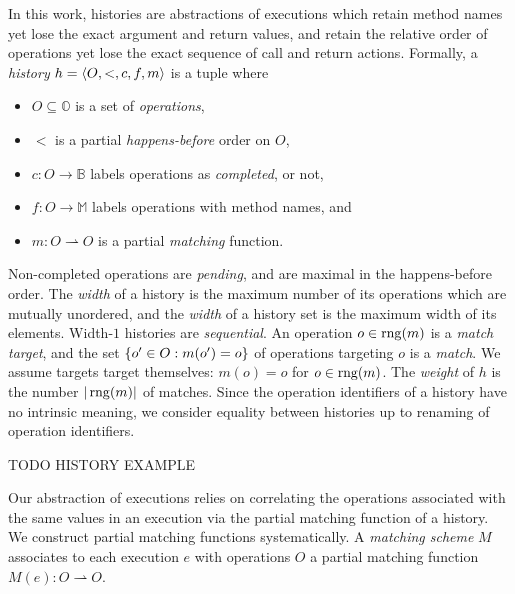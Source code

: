 In this work, histories are abstractions of executions which retain method
names yet lose the exact argument and return values, and retain the relative
order of operations yet lose the exact sequence of call and return actions.
Formally, a \emph{history} $h = {\left\langle{O,<,c,f,m}\right\rangle}$ is a tuple where
\begin{itemize}

  \item $O \subseteq \mathbb{O}$ is a set of \emph{operations},

  \item $<$ is a partial \emph{happens-before} order on $O$,

  \item $c: O \to \mathbb{B}$ labels operations as \emph{completed}, or not,

  \item $f: O \to \mathbb{M}$ labels operations with method names, and

  \item $m: O \rightharpoonup O$ is a partial \emph{matching} function.

\end{itemize}
Non-completed operations are \emph{pending}, and are maximal in the
happens-before order. The \emph{width} of a history is the maximum number of
its operations which are mutually unordered, and the \emph{width} of a history
set is the maximum width of its elements. Width-$1$ histories are
\emph{sequential}. An operation $o \in \operatorname{rng}(m)$ is a \emph{match target}, and
the set ${\{{ o' \in O : m(o') = o}\}}$ of operations targeting $o$ is a
\emph{match}. We assume targets target themselves: $m(o) = o$ for $o \in
\operatorname{rng}(m)$. The \emph{weight} of $h$ is the number $|\operatorname{rng}(m)|$ of matches.
Since the operation identifiers of a history have no intrinsic meaning, we
consider equality between histories up to renaming of operation identifiers.

\begin{example}

  TODO HISTORY EXAMPLE

\end{example}

Our abstraction of executions relies on correlating the operations associated
with the same values in an execution via the partial matching function of a
history. We construct partial matching functions systematically. A
\emph{matching scheme} $M$ associates to each execution $e$ with operations $O$
a partial matching function $M(e): O \rightharpoonup O$.


